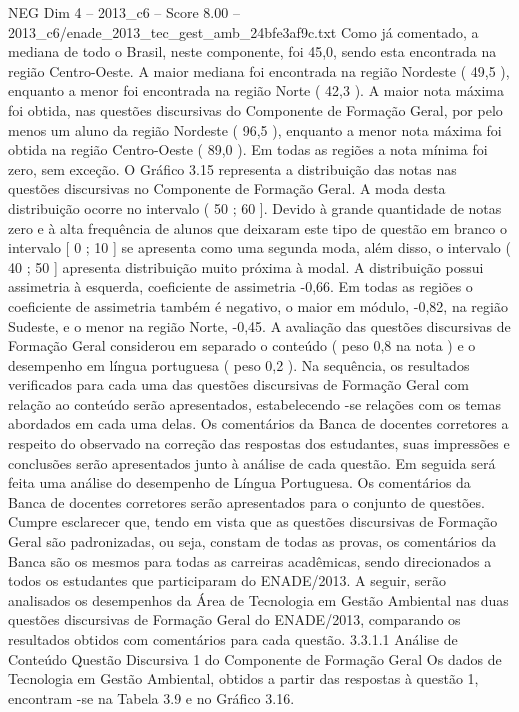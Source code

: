 \begin{textsample}{NEG Dim 4 – 2013\_c6 – Score 8.00 – 2013\_c6/enade\_2013\_tec\_gest\_amb\_24bfe3af9c.txt}
Como já comentado, a mediana de todo o Brasil, neste componente, foi 45,0, sendo esta encontrada na região Centro-Oeste.
A maior mediana foi encontrada na região Nordeste ( 49,5 ), enquanto a menor foi encontrada na região Norte ( 42,3 ).
A maior nota máxima foi obtida, nas questões discursivas do Componente de Formação Geral, por pelo menos um aluno da região Nordeste ( 96,5 ), enquanto a menor nota máxima foi obtida na região Centro-Oeste ( 89,0 ).
Em todas as regiões a nota mínima foi zero, sem exceção.
O Gráfico 3.15 representa a distribuição das notas nas questões discursivas no Componente de Formação Geral.
A moda desta distribuição ocorre no intervalo ( 50 ; 60 ].
Devido à grande quantidade de notas zero e à alta frequência de alunos que deixaram este tipo de questão em branco o intervalo [ 0 ; 10 ] se apresenta como uma segunda moda, além disso, o intervalo ( 40 ; 50 ] apresenta distribuição muito próxima à modal.
A distribuição possui assimetria à esquerda, coeficiente de assimetria -0,66.
Em todas as regiões o coeficiente de assimetria também é negativo, o maior em módulo, -0,82, na região Sudeste, e o menor na região Norte, -0,45.
A avaliação das questões discursivas de Formação Geral considerou em separado o conteúdo ( peso 0,8 na nota ) e o desempenho em língua portuguesa ( peso 0,2 ).
Na sequência, os resultados verificados para cada uma das questões discursivas de Formação Geral com relação ao conteúdo serão apresentados, estabelecendo -se relações com os temas abordados em cada uma delas.
Os comentários da Banca de docentes corretores a respeito do observado na correção das respostas dos estudantes, suas impressões e conclusões serão apresentados junto à análise de cada questão.
Em seguida será feita uma análise do desempenho de Língua Portuguesa.
Os comentários da Banca de docentes corretores serão apresentados para o conjunto de questões.
Cumpre esclarecer que, tendo em vista que as questões discursivas de Formação Geral são padronizadas, ou seja, constam de todas as provas, os comentários da Banca são os mesmos para todas as carreiras acadêmicas, sendo direcionados a todos os estudantes que participaram do ENADE/2013.
A seguir, serão analisados os desempenhos da Área de Tecnologia em Gestão Ambiental nas duas questões discursivas de Formação Geral do ENADE/2013, comparando os resultados obtidos com comentários para cada questão. 3.3.1.1 Análise de Conteúdo Questão Discursiva 1 do Componente de Formação Geral Os dados de Tecnologia em Gestão Ambiental, obtidos a partir das respostas à questão 1, encontram -se na Tabela 3.9 e no Gráfico 3.16.

\end{textsample}
